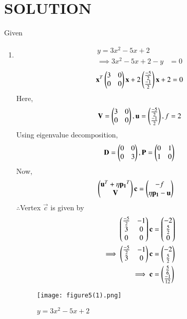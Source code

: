 \documentclass[journal,12pt,twocolumn]{IEEEtran}
\begin{document}
\section{SOLUTION}  
Given
\begin{enumerate}
\item
    \begin{align}
        y = 3x^2-5x+2\\
        \implies 3x^2-5x+2-y &=0
    \end{align}
    \begin{align}
    \mathbf{x}^T \begin{pmatrix}3 & 0\\0 & 0\end{pmatrix}\mathbf{x}+ 2\begin{pmatrix}\frac{-5}{2} \\ \frac{-1}{2}\end{pmatrix}\mathbf{x}+2=0
\end{align}
    Here,
    \begin{align}
        \mathbf{V} = \begin{pmatrix}3 & 0 \\ 0 & 0\end{pmatrix},\mathbf{u}=\begin{pmatrix}\frac{-5}{2} \\ \frac{-1}{2}\end{pmatrix},f=2
    \end{align}
     Using eigenvalue decomposition,
    \begin{align}
        \mathbf{D} = \begin{pmatrix}0 & 0\\0 & 3\end{pmatrix} ,\mathbf{P}=\begin{pmatrix}0 & 1\\1 & 0\end{pmatrix}
    \end{align}
Now,
\begin{align}
    \begin{pmatrix}\mathbf{u}^T + \eta\mathbf{p_1}^T \\ \mathbf{V}\end{pmatrix}\mathbf{c} &= \begin{pmatrix}-f \\ \eta\mathbf{p_1}-\mathbf{u}\end{pmatrix} 
\end{align}
    $\therefore$Vertex $\vec{c}$ is given by
    \begin{align}
        \begin{pmatrix}\frac{-5}{2} & -1 \\ 3 & 0 \\ 0 & 0\end{pmatrix}\mathbf{c} &= \begin{pmatrix}-2 \\ \frac{5}{2} \\ 0\end{pmatrix} \\
     \implies  \begin{pmatrix}\frac{-5}{2} & -1 \\ 3 & 0\end{pmatrix}\mathbf{c} &= \begin{pmatrix}-2 \\ \frac{5}{2}\end{pmatrix}
        \\
        \implies \mathbf{c} &= \begin{pmatrix}\frac{5}{6}\\\frac{-1}{12}\end{pmatrix}
    \end{align}
    
    \begin{figure}[!ht]
    \centering
    \texttt{[image: figure5(1).png]}
    \caption{$y=3x^2-5x+2$}
    \label{ex3}	
    \end{figure}
    

\end{enumerate}
\end{document}
